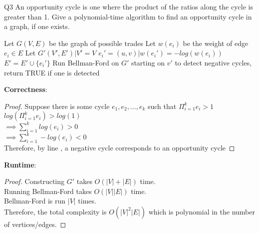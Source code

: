 \begin{problem}
  {Q3}
  An opportunity cycle is one where the product of the ratios along the cycle is greater than 1.
  Give a polynomial-time algorithm to find an opportunity cycle in a graph, if one exists. \\
  \begin{algorithmic}[1]
    \STATE Let $G(V,E)$ be the graph of possible trades
    \STATE Let $w(e_i)$ be the weight of edge $e_i \in E$
    \STATE Let $G'(V', E') | V' = V$
    \STATE $e_i' = (u, v) | w(e_i') = -log(w(e_i))$
    \STATE $E' = E' \cup \{e_i'\}$
    \ENDFOR
    \STATE Run Bellman-Ford on $G'$ starting on $v'$ to detect negative cycles, return TRUE if one is detected
    \ENDFOR
  \end{algorithmic}
  \noindent
  \textbf{Correctness}:
  \begin{proof}
      Suppose there is some cycle $e_1, e_2, \dots, e_k$ such that $\Pi_{i = 1}^{k}e_i > 1$
      $log\left(\Pi_{i = 1}^{k}e_i\right) > log(1)$ \\
      $\implies \sum_{i = 1}^{k} log(e_i) > 0$ \\
      $\implies \sum_{i = 1}^{k} -log(e_i) < 0$ \\
      Therefore, by line , a negative cycle corresponds to an opportunity cycle%
  \end{proof}
  \textbf{Runtime}:
  \begin{proof}
      Constructing $G'$ takes $O(|V| + |E|)$ time.  \\
      Running Bellman-Ford takes $O(|V||E|)$ time.  \\
      Bellman-Ford is run $|V|$ times. \\
      Therefore, the total complexity is $O(|V|^2|E|)$ which is polynomial in the number of vertices/edges.
  \end{proof}
\end{problem}
